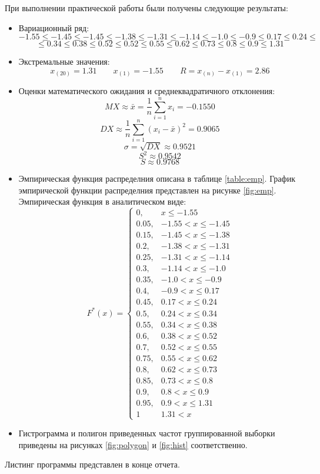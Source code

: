 \documentclass{article}
\begin{document}
  При выполнении практической работы были получены следующие результаты:
  \begin{itemize}
    \item Вариационный ряд:
    \[
      -1.55 \leq -1.45 \leq -1.45 \leq -1.38 \leq -1.31 \leq -1.14 \leq -1.0
      \leq -0.9 \leq 0.17 \leq 0.24   \leq
    \]
    \[
      \leq 0.34 \leq 0.38 \leq 0.52 \leq 0.52 \leq 0.55 \leq 0.62 \leq 0.73
      \leq 0.8 \leq 0.9 \leq 1.31
    \]
    \item Экстремальные значения:
    \[
      x_{(20)} = 1.31 \qquad x_{(1)} = -1.55 \qquad R = x_{(n)} - x_{(1)} = 2.86
    \]
    \item Оценки математического ожидания и среднеквадратичного отклонения:
    \[ MX \approx \bar x = \frac{1}{n} \sum_{i=1}^n x_i = -0.1550 \]
    \[ DX \approx \frac{1}{n} \sum_{i=1}^n \left(x_i - \bar x \right)^2 = 0.9065 \]
    \[ \sigma = \sqrt{DX} \approx 0.9521  \]
    \[ S^2 \approx 0.9542 \]
    \[ S \approx 0.9768 \]
    \item Эмпирическая функция распределния описана в таблице \ref{table:emp}.
    График эмпирической функции распределния представлен на рисунке \ref{fig:emp}.
    Эмпирическая функция в аналитическом виде:
      \[
        F^*(x) = \begin{cases}
          0,      & x \leq -1.55 \\
          0.05, & -1.55 < x \leq -1.45 \\
          0.15, & -1.45 < x \leq -1.38 \\
          0.2, & -1.38 < x \leq -1.31 \\
          0.25, & -1.31 < x \leq -1.14 \\
          0.3, & -1.14 < x \leq -1.0 \\
          0.35, & -1.0 < x \leq -0.9 \\
          0.4, & -0.9 < x \leq 0.17 \\
          0.45, & 0.17 < x \leq 0.24 \\
          0.5, & 0.24 < x \leq 0.34 \\
          0.55, & 0.34 < x \leq 0.38 \\
          0.6, & 0.38 < x \leq 0.52 \\
          0.7, & 0.52 < x \leq 0.55 \\
          0.75, & 0.55 < x \leq 0.62 \\
          0.8, & 0.62 < x \leq 0.73 \\
          0.85, & 0.73 < x \leq 0.8 \\
          0.9, & 0.8 < x \leq 0.9 \\
          0.95, & 0.9 < x \leq 1.31 \\
          1 & 1.31 < x
        \end{cases}
      \]
    
    \item Гистрограмма и полигон приведенных частот группированной выборки приведены на
    рисунках \ref{fig:polygon} и \ref{fig:hist} соответственно.
  \end{itemize}
  Листинг программы представлен в конце отчета.
\end{document}

